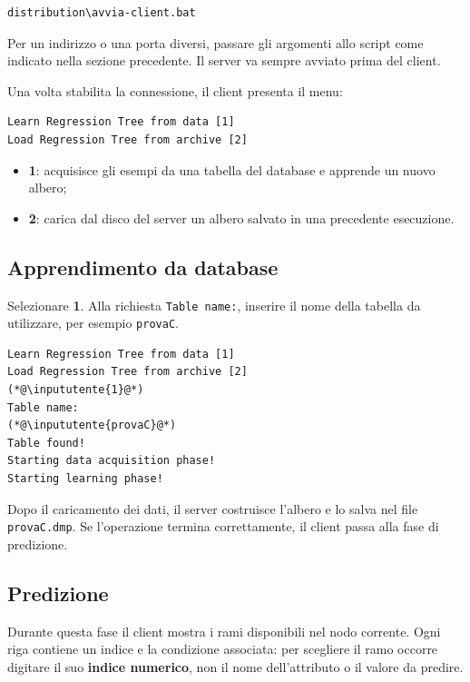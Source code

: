 \documentclass[11pt,a4paper]{article}
\begin{document}
\begin{lstlisting}
distribution\avvia-client.bat
\end{lstlisting}

Per un indirizzo o una porta diversi, passare gli argomenti allo script come
indicato nella sezione precedente. Il server va sempre avviato prima del client.

Una volta stabilita la connessione, il client presenta il menu:

\begin{lstlisting}
Learn Regression Tree from data [1]
Load Regression Tree from archive [2]
\end{lstlisting}

\begin{itemize}
  \item \textbf{1}: acquisisce gli esempi da una tabella del database e apprende
        un nuovo albero;
  \item \textbf{2}: carica dal disco del server un albero salvato in una
        precedente esecuzione.
\end{itemize}

\subsection*{Apprendimento da database}

Selezionare \textbf{1}. Alla richiesta \texttt{Table name:}, inserire il nome
della tabella da utilizzare, per esempio \texttt{provaC}.

\begin{lstlisting}
Learn Regression Tree from data [1]
Load Regression Tree from archive [2]
(*@\inpututente{1}@*)
Table name:
(*@\inpututente{provaC}@*)
Table found!
Starting data acquisition phase!
Starting learning phase!
\end{lstlisting}

Dopo il caricamento dei dati, il server costruisce l'albero e lo salva nel file
\texttt{provaC.dmp}. Se l'operazione termina correttamente, il client passa
alla fase di predizione.

\clearpage
\subsection*{Predizione}

Durante questa fase il client mostra i rami disponibili nel nodo corrente.
Ogni riga contiene un indice e la condizione associata: per scegliere il ramo
occorre digitare il suo \textbf{indice numerico}, non il nome dell'attributo
o il valore da predire.
\end{document}
